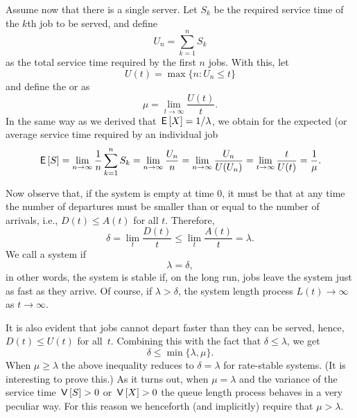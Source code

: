 Assume now that there is a single server. Let $S_k$ be the required
service time of the $k$th job to be served, and define
\begin{equation*}
U_n = \sum_{k=1}^n S_k
\end{equation*}
as the total service time required by the first $n$ jobs. With this,
let 
\begin{equation*}
  U(t) = \max\{n: U_n \leq t\}
\end{equation*}
and  define the  or  as
\begin{equation*}
  \mu = \lim_{t\to\infty} \frac{U(t)}t.
\end{equation*}
In the same way as we derived that $\,\mathsf{E}\left[X\right]= 1/\lambda$, we obtain for the expected (or average service time required by an individual job
\begin{equation*}
  \,\mathsf{E}\left[S\right] = \lim_{n\to\infty} \frac 1 n \sum_{k=1}^n S_k = \lim_{n\to\infty} \frac{U_n}{n} = \lim_{n\to\infty} \frac{U_n}{U(U_n)} = \lim_{t\to\infty} \frac t{U(t)} = \frac 1 \mu.
\end{equation*}

Now observe that, if the system is empty at time $0$, it must be that
at any time the number of departures must be smaller than or equal to the number
of arrivals, i.e., $D(t) \leq A(t)$ for all $t$. Therefore,
\begin{equation}\label{eq:26}
\delta =   \lim_t \frac{D(t)}t \leq \lim_t \frac{A(t)}t = \lambda.
\end{equation}
We call a system  if
\begin{equation*}
  \lambda = \delta,
\end{equation*}
in other words, the system is stable if, on the long run, jobs leave
the system just as fast as they arrive. Of course, if
$\lambda > \delta$, the system length process $L(t) \to \infty$ as
$t\to \infty$.

It is also evident that jobs cannot depart faster than they can be
served, hence, $D(t) \leq U(t)$ for all~$t$. Combining this with the
fact that $\delta \leq \lambda$, we get
\begin{equation*}
  \delta \leq \min\{\lambda, \mu\}.
\end{equation*}
When $\mu \geq \lambda$ the above inequality reduces to $\delta = \lambda$ for rate-stable systems.
(It is interesting to prove this.)
As it turns out, when $\mu = \lambda$ and the variance of the service time $\,\mathsf{V}\left[S\right] > 0$ or $\,\mathsf{V}\left[X\right] >0$ the queue length process behaves in a very peculiar way.
For this reason we henceforth (and implicitly) require that $\mu > \lambda$.



